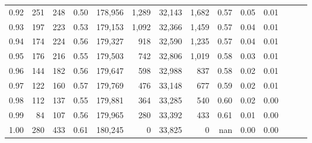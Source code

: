 \begin{tabular}{rrrrrrrrrrrrrr}
0.92 &    251 &  248 &  0.50 &  178,956 &    1,289 &  32,143 &   1,682 &  0.57 &  0.05 &      0.01 \\
0.93 &    197 &  223 &  0.53 &  179,153 &    1,092 &  32,366 &   1,459 &  0.57 &  0.04 &      0.01 \\
0.94 &    174 &  224 &  0.56 &  179,327 &      918 &  32,590 &   1,235 &  0.57 &  0.04 &      0.01 \\
0.95 &    176 &  216 &  0.55 &  179,503 &      742 &  32,806 &   1,019 &  0.58 &  0.03 &      0.01 \\
0.96 &    144 &  182 &  0.56 &  179,647 &      598 &  32,988 &     837 &  0.58 &  0.02 &      0.01 \\
0.97 &    122 &  160 &  0.57 &  179,769 &      476 &  33,148 &     677 &  0.59 &  0.02 &      0.01 \\
0.98 &    112 &  137 &  0.55 &  179,881 &      364 &  33,285 &     540 &  0.60 &  0.02 &      0.00 \\
0.99 &     84 &  107 &  0.56 &  179,965 &      280 &  33,392 &     433 &  0.61 &  0.01 &      0.00 \\
1.00 &    280 &  433 &  0.61 &  180,245 &        0 &  33,825 &       0 &   nan &  0.00 &      0.00 \\
\bottomrule
\end{tabular}
